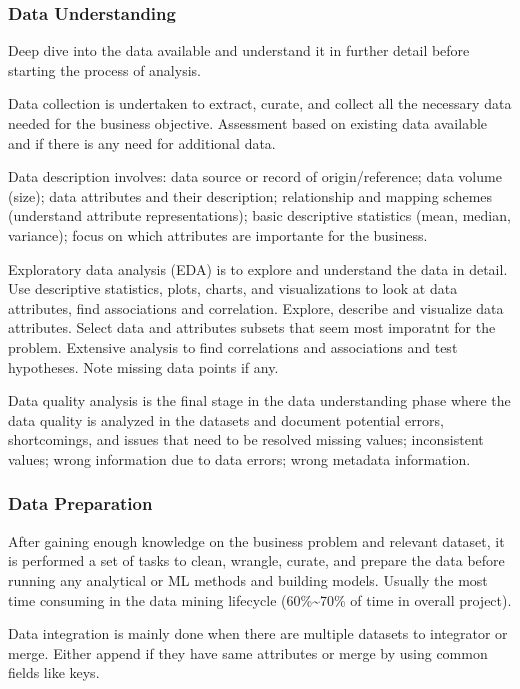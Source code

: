 \hypertarget{data-understanding}{%
\subsubsection{Data Understanding}\label{data-understanding}}

Deep dive into the data available and understand it in further detail
before starting the process of analysis.

Data collection is undertaken to extract, curate, and collect all the
necessary data needed for the business objective. Assessment based on
existing data available and if there is any need for additional data.

Data description involves: data source or record of origin/reference;
data volume (size); data attributes and their description; relationship
and mapping schemes (understand attribute representations); basic
descriptive statistics (mean, median, variance); focus on which
attributes are importante for the business.

Exploratory data analysis (EDA) is to explore and understand the data in
detail. Use descriptive statistics, plots, charts, and visualizations to
look at data attributes, find associations and correlation. Explore,
describe and visualize data attributes. Select data and attributes
subsets that seem most imporatnt for the problem. Extensive analysis to
find correlations and associations and test hypotheses. Note missing
data points if any.

Data quality analysis is the final stage in the data understanding phase
where the data quality is analyzed in the datasets and document
potential errors, shortcomings, and issues that need to be resolved
missing values; inconsistent values; wrong information due to data
errors; wrong metadata information.

\hypertarget{data-preparation}{%
\subsubsection{Data Preparation}\label{data-preparation}}

After gaining enough knowledge on the business problem and relevant
dataset, it is performed a set of tasks to clean, wrangle, curate, and
prepare the data before running any analytical or ML methods and
building models. Usually the most time consuming in the data mining
lifecycle (60\%\textasciitilde70\% of time in overall project).

Data integration is mainly done when there are multiple datasets to
integrator or merge. Either append if they have same attributes or merge
by using common fields like keys.


